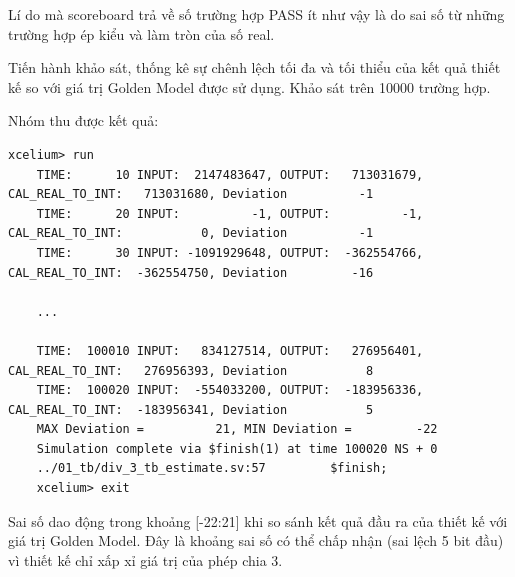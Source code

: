 Lí do mà scoreboard trả về số trường hợp PASS ít như vậy là do sai số từ những trường hợp ép kiểu và làm tròn của số real.

Tiến hành khảo sát, thống kê sự chênh lệch tối đa và tối thiểu của kết quả thiết kế so với giá trị Golden Model được sử dụng. Khảo sát trên 10000 trường hợp.



Nhóm thu được kết quả:

\begin{lstlisting}[style=StyleResult, language=Result, caption={Kết quả kiểm định cho bộ xấp xỉ chia 3.}]
	xcelium> run
	TIME:      10 INPUT:  2147483647, OUTPUT:   713031679, CAL_REAL_TO_INT:   713031680, Deviation          -1
	TIME:      20 INPUT:          -1, OUTPUT:          -1, CAL_REAL_TO_INT:           0, Deviation          -1
	TIME:      30 INPUT: -1091929648, OUTPUT:  -362554766, CAL_REAL_TO_INT:  -362554750, Deviation         -16
	
	...
	
	TIME:  100010 INPUT:   834127514, OUTPUT:   276956401, CAL_REAL_TO_INT:   276956393, Deviation           8
	TIME:  100020 INPUT:  -554033200, OUTPUT:  -183956336, CAL_REAL_TO_INT:  -183956341, Deviation           5
	MAX Deviation =          21, MIN Deviation =         -22
	Simulation complete via $finish(1) at time 100020 NS + 0
	../01_tb/div_3_tb_estimate.sv:57         $finish;
	xcelium> exit
\end{lstlisting}

Sai số dao động trong khoảng [-22:21] khi so sánh kết quả đầu ra của thiết kế với giá trị Golden Model. Đây là khoảng sai số có thể chấp nhận (sai lệch 5 bit đầu) vì thiết kế chỉ xấp xỉ giá trị của phép chia 3.

